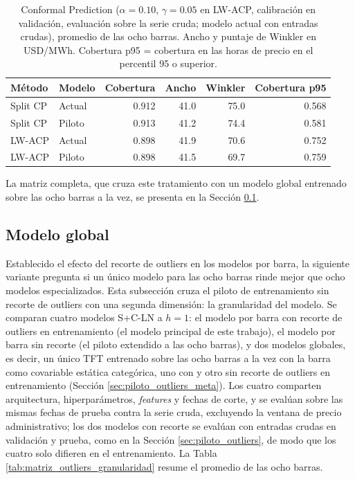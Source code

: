 \begin{table}[htbp]
    \centering
    \begin{tabular}{llrrrr}
        \toprule
        Método & Modelo & Cobertura & Ancho & Winkler & Cobertura p95 \\
        \midrule
        Split CP & Actual & 0.912 & 41.0 & 75.0 & 0.568 \\
        Split CP & Piloto & 0.913 & 41.2 & 74.4 & 0.581 \\
        LW-ACP   & Actual & 0.898 & 41.9 & 70.6 & 0.752 \\
        LW-ACP   & Piloto & 0.898 & 41.5 & 69.7 & 0.759 \\
        \bottomrule
    \end{tabular}
    \vspace{0.2cm}
    \caption{Conformal Prediction ($\alpha=0.10$, $\gamma=0.05$ en LW-ACP, calibración en validación, evaluación sobre la serie cruda; modelo actual con entradas crudas), promedio de las ocho barras. Ancho y puntaje de Winkler en USD/MWh. Cobertura p95 = cobertura en las horas de precio en el percentil 95 o superior.}
    \label{tab:piloto_cp}
\end{table}

La matriz completa, que cruza este tratamiento con un modelo global entrenado sobre las ocho barras a la vez, se presenta en la Sección \ref{sec:matriz_outliers}.

\subsection{Modelo global}
\label{sec:matriz_outliers}

Establecido el efecto del recorte de outliers en los modelos por barra, la siguiente variante pregunta si un único modelo para las ocho barras rinde mejor que ocho modelos especializados. Esta subsección cruza el piloto de entrenamiento sin recorte de outliers con una segunda dimensión: la granularidad del modelo. Se comparan cuatro modelos S+C-LN a $h=1$: el modelo por barra con recorte de outliers en entrenamiento (el modelo principal de este trabajo), el modelo por barra sin recorte (el piloto extendido a las ocho barras), y dos modelos globales, es decir, un único TFT entrenado sobre las ocho barras a la vez con la barra como covariable estática categórica, uno con y otro sin recorte de outliers en entrenamiento (Sección \ref{sec:piloto_outliers_meta}). Los cuatro comparten arquitectura, hiperparámetros, \textit{features} y fechas de corte, y se evalúan sobre las mismas fechas de prueba contra la serie cruda, excluyendo la ventana de precio administrativo; los dos modelos con recorte se evalúan con entradas crudas en validación y prueba, como en la Sección \ref{sec:piloto_outliers}, de modo que los cuatro solo difieren en el entrenamiento. La Tabla \ref{tab:matriz_outliers_granularidad} resume el promedio de las ocho barras.

